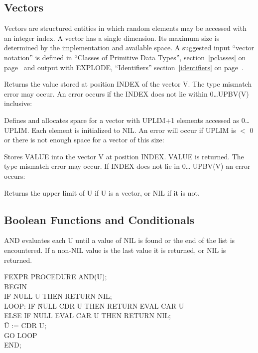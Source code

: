 \documentclass[11pt,letterpaper]{book}
\begin{document}
\subsection{Vectors}
\label{vectors}
Vectors are structured entities in which random elements may be
accessed with an integer index. A vector has a single dimension. Its
maximum size is determined by the implementation and available space.
A suggested input ``vector notation'' is defined in ``Classes of
Primitive Data Types'', section~\ref{pclasses} on
page~\pageref{pclasses} and output with EXPLODE, ``Identifiers''
section~\ref{identifiers} on page~\pageref{identifiers}.


{Returns the value stored at position INDEX of the vector V. The type
mismatch error may occur. An error occurs if the INDEX does not lie
within 0\ldots UPBV(V) inclusive:

}


{Defines and allocates space for a vector with UPLIM+1 elements
accessed as 0\ldots UPLIM. Each element is initialized to NIL. An
error will occur if UPLIM is $<$ 0 or there is not enough space for a
vector of this size:

}


{Stores VALUE into the vector V at position INDEX. VALUE is returned.
The type mismatch error may occur. If INDEX does not lie in 0\ldots
UPBV(V) an error occurs:

}


{Returns the upper limit of U if U is a vector, or NIL if it is not.}


\subsection{Boolean Functions and Conditionals}


{AND evaluates each U until a value of NIL is found or the end of the
list is encountered. If a non-NIL value is the last value it is
returned, or NIL is returned.

{\tt \begin{tabbing} FEXPR PROCEDURE AND(U); \\ BEGIN \\
\hspace*{1em} IF NULL U THEN RETURN NIL; \\
LOOP: IF \= NULL CDR U THEN RETURN EVAL CAR U \\
\> ELSE IF NULL EVAL CAR U THEN RETURN NIL; \\
\hspace*{2em} \= U := CDR U; \\
\> GO LOOP \\
END;
\end{tabbing} }}
\end{document}
